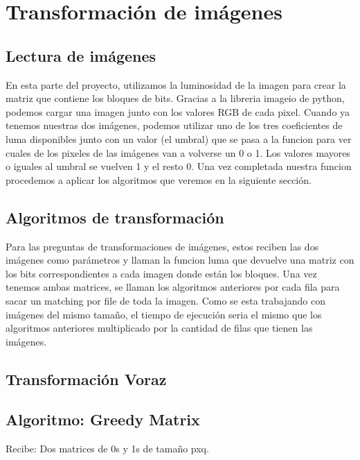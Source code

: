 \documentclass[12pt]{article}
\begin{document}
\section*{Transformación de imágenes}

\subsection*{Lectura de imágenes}
 
\noindent En esta parte del proyecto, utilizamos la luminosidad de la imagen para crear la matriz que 
contiene los bloques de bits. Gracias a la libreria imageio de python, podemos cargar una imagen junto 
con los valores RGB de cada pixel. Cuando ya tenemos nuestras dos imágenes, podemos utilizar uno de los 
tres coeficientes de luma disponibles junto con un valor (el umbral) que se pasa a la funcion para ver cuales de los 
pixeles de las imágenes van a volverse un 0 o 1. Los valores mayores o iguales al umbral se vuelven 1 y el resto 0. 
Una vez completada nuestra funcion procedemos a aplicar los algoritmos que veremos en la siguiente sección.

\subsection*{Algoritmos de transformación}

\noindent Para las preguntas de transformaciones de imágenes, estos reciben las dos imágenes como 
parámetros y llaman la funcion luma que devuelve una matriz con los bits correspondientes a cada imagen 
donde están los bloques. Una vez tenemos ambas matrices, se llaman los algoritmos anteriores por cada fila 
para sacar un matching por file de toda la imagen. Como se esta trabajando con imágenes del mismo tamaño, 
el tiempo de ejecución seria el mismo que los algoritmos anteriores multiplicado por la cantidad de 
filas que tienen las imágenes.\\

\subsection*{Transformación Voraz}

\subsection*{Algoritmo: Greedy Matrix}

\noindent Recibe: Dos matrices de 0s y 1s de tamaño pxq.
\end{document}
